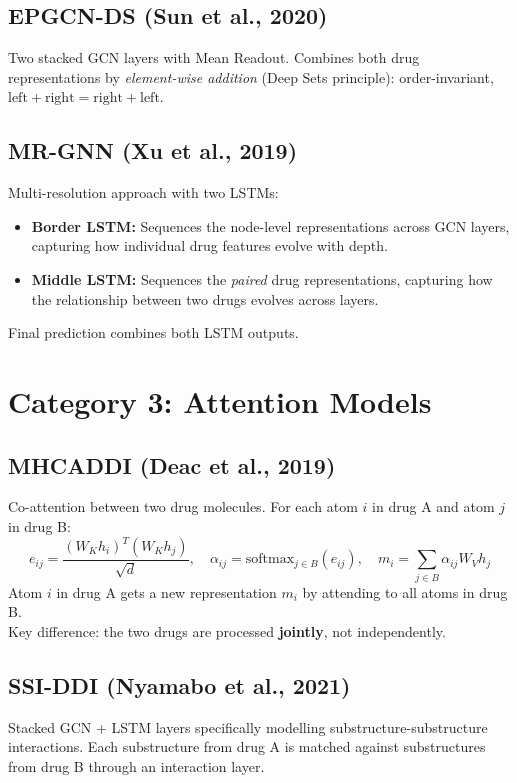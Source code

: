\documentclass[12pt,a4paper,oneside]{book}
\begin{document}
\subsection{EPGCN-DS (Sun et al., 2020)}
Two stacked GCN layers with Mean Readout. Combines both drug representations by \textit{element-wise addition} (Deep Sets principle): order-invariant, $\text{left} + \text{right} = \text{right} + \text{left}$.

\subsection{MR-GNN (Xu et al., 2019)}
Multi-resolution approach with two LSTMs:
\begin{itemize}
  \item \textbf{Border LSTM:} Sequences the node-level representations across GCN layers, capturing how individual drug features evolve with depth.
  \item \textbf{Middle LSTM:} Sequences the \textit{paired} drug representations, capturing how the relationship between two drugs evolves across layers.
\end{itemize}
Final prediction combines both LSTM outputs.

\section{Category 3: Attention Models}

\subsection{MHCADDI (Deac et al., 2019)}
Co-attention between two drug molecules. For each atom $i$ in drug A and atom $j$ in drug B:
\[
e_{ij}=\frac{(W_K h_i)^T(W_K h_j)}{\sqrt{d}},\quad
\alpha_{ij}=\mathrm{softmax}_{j \in B}(e_{ij}),\quad
m_i=\sum_{j \in B} \alpha_{ij}W_V h_j
\]
Atom $i$ in drug A gets a new representation $m_i$ by attending to all atoms in drug B.\\
Key difference: the two drugs are processed \textbf{jointly}, not independently.

\subsection{SSI-DDI (Nyamabo et al., 2021)}
Stacked GCN + LSTM layers specifically modelling substructure-substructure interactions. Each substructure from drug A is matched against substructures from drug B through an interaction layer.
\end{document}
